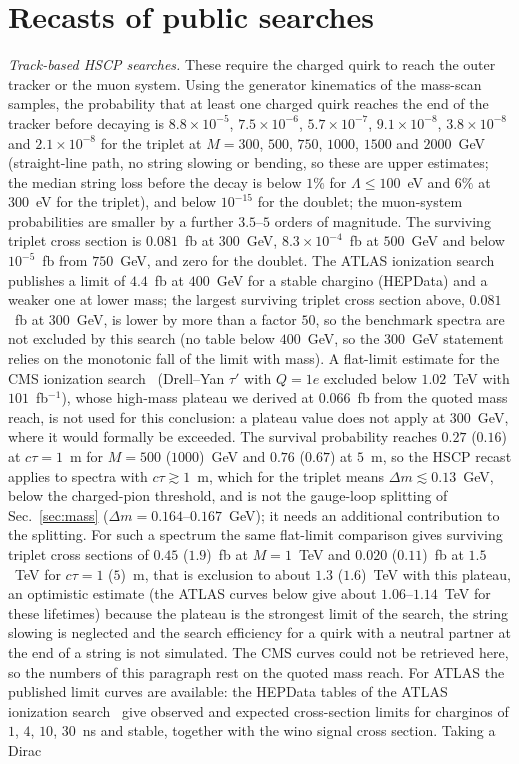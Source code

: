 \documentclass[prd,twocolumn,nofootinbib,superscriptaddress,amsmath,amssymb]{revtex4-2}
\begin{document}
\section{Recasts of public searches}\label{sec:recast}
\emph{Track-based HSCP searches.} These require the charged quirk to reach the outer tracker or the muon system. Using the generator kinematics of the mass-scan samples, the probability that at least one charged quirk reaches the end of the tracker before decaying is $8.8\times10^{-5}$, $7.5\times10^{-6}$, $5.7\times10^{-7}$, $9.1\times10^{-8}$, $3.8\times10^{-8}$ and $2.1\times10^{-8}$ for the triplet at $M=300$, $500$, $750$, $1000$, $1500$ and $2000$~GeV (straight-line path, no string slowing or bending, so these are upper estimates; the median string loss before the decay is below $1\%$ for $\Lambda\le100$~eV and $6\%$ at $300$~eV for the triplet), and below $10^{-15}$ for the doublet; the muon-system probabilities are smaller by a further $3.5$--$5$ orders of magnitude. The surviving triplet cross section is $0.081$~fb at $300$~GeV, $8.3\times10^{-4}$~fb at $500$~GeV and below $10^{-5}$~fb from $750$~GeV, and zero for the doublet. The ATLAS ionization search~\cite{ATLAS:HSCP} publishes a limit of $4.4$~fb at $400$~GeV for a stable chargino (HEPData) and a weaker one at lower mass; the largest surviving triplet cross section above, $0.081$~fb at $300$~GeV, is lower by more than a factor $50$, so the benchmark spectra are not excluded by this search (no table below $400$~GeV, so the $300$~GeV statement relies on the monotonic fall of the limit with mass). A flat-limit estimate for the CMS ionization search~\cite{CMS:2024HSCP} (Drell--Yan $\tau'$ with $Q=1e$ excluded below $1.02$~TeV with $101$~fb$^{-1}$), whose high-mass plateau we derived at $0.066$~fb from the quoted mass reach, is not used for this conclusion: a plateau value does not apply at $300$~GeV, where it would formally be exceeded. The survival probability reaches $0.27$ ($0.16$) at $c\tau=1$~m for $M=500$ ($1000$)~GeV and $0.76$ ($0.67$) at $5$~m, so the HSCP recast applies to spectra with $c\tau\gtrsim1$~m, which for the triplet means $\Delta m\lesssim0.13$~GeV, below the charged-pion threshold, and is not the gauge-loop splitting of Sec.~\ref{sec:mass} ($\Delta m=0.164$--$0.167$~GeV); it needs an additional contribution to the splitting. For such a spectrum the same flat-limit comparison gives surviving triplet cross sections of $0.45$ ($1.9$)~fb at $M=1$~TeV and $0.020$ ($0.11$)~fb at $1.5$~TeV for $c\tau=1$ ($5$)~m, that is exclusion to about $1.3$ ($1.6$)~TeV with this plateau, an optimistic estimate (the ATLAS curves below give about $1.06$--$1.14$~TeV for these lifetimes) because the plateau is the strongest limit of the search, the string slowing is neglected and the search efficiency for a quirk with a neutral partner at the end of a string is not simulated. The CMS curves could not be retrieved here, so the numbers of this paragraph rest on the quoted mass reach. For ATLAS the published limit curves are available: the HEPData tables of the ATLAS ionization search~\cite{ATLAS:HSCP} give observed and expected cross-section limits for charginos of $1$, $4$, $10$, $30$~ns and stable, together with the wino signal cross section. Taking a Dirac 
\end{document}
